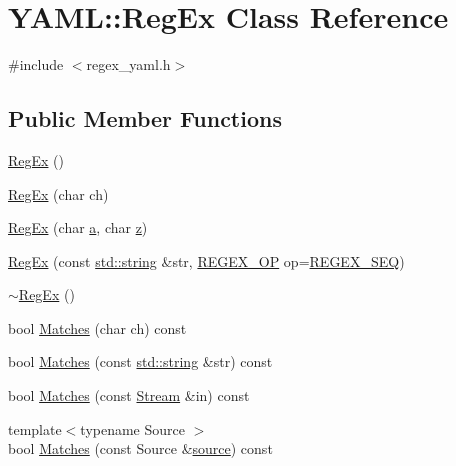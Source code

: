 \hypertarget{class_y_a_m_l_1_1_reg_ex}{}\section{Y\+A\+ML\+::Reg\+Ex Class Reference}
\label{class_y_a_m_l_1_1_reg_ex}


{\ttfamily \#include $<$regex\+\_\+yaml.\+h$>$}

\subsection*{Public Member Functions}
\begin{DoxyCompactItemize}
\item 
\mbox{\hyperlink{class_y_a_m_l_1_1_reg_ex_a0a5cddd7b593c6639719548354d06fb0}{Reg\+Ex}} ()
\item 
\mbox{\hyperlink{class_y_a_m_l_1_1_reg_ex_a8372b564902a9133eccfec69e419829c}{Reg\+Ex}} (char ch)
\item 
\mbox{\hyperlink{class_y_a_m_l_1_1_reg_ex_a1542cf4dfc5063ab76e7c4a359a85964}{Reg\+Ex}} (char \mbox{\hyperlink{glad_8h_ac8729153468b5dcf13f971b21d84d4e5}{a}}, char \mbox{\hyperlink{glad_8h_acb78bf1972d3eaf07da34ff2e0a2f133}{z}})
\item 
\mbox{\hyperlink{class_y_a_m_l_1_1_reg_ex_a9a158130aef316729dc5f35d99168590}{Reg\+Ex}} (const \mbox{\hyperlink{glad_8h_ac83513893df92266f79a515488701770}{std\+::string}} \&str, \mbox{\hyperlink{namespace_y_a_m_l_a7bdf8e8bf393f2547c682451e088023c}{R\+E\+G\+E\+X\+\_\+\+OP}} op=\mbox{\hyperlink{namespace_y_a_m_l_a7bdf8e8bf393f2547c682451e088023ca1b4d004e2e170a51eaa327480acd5761}{R\+E\+G\+E\+X\+\_\+\+S\+EQ}})
\item 
\mbox{\hyperlink{class_y_a_m_l_1_1_reg_ex_afd63983e69e470e2399d9b92fa84a070}{$\sim$\+Reg\+Ex}} ()
\item 
bool \mbox{\hyperlink{class_y_a_m_l_1_1_reg_ex_a7a09aef4713985c80b4d1a1f17d57feb}{Matches}} (char ch) const
\item 
bool \mbox{\hyperlink{class_y_a_m_l_1_1_reg_ex_afd6dd2d8c567bf9fc33cf1a9dd3be895}{Matches}} (const \mbox{\hyperlink{glad_8h_ac83513893df92266f79a515488701770}{std\+::string}} \&str) const
\item 
bool \mbox{\hyperlink{class_y_a_m_l_1_1_reg_ex_a30bbe0a734cde6939a8039963fa7bb48}{Matches}} (const \mbox{\hyperlink{class_y_a_m_l_1_1_stream}{Stream}} \&in) const
\item 
{\footnotesize template$<$typename Source $>$ }\\bool \mbox{\hyperlink{class_y_a_m_l_1_1_reg_ex_a2690a7654d9b0df2affb6f77373d1ddd}{Matches}} (const Source \&\mbox{\hyperlink{glad_8h_a6ffd2192cbc75d017665e95207ee36a7}{source}}) const

\end{DoxyCompactItemize}
